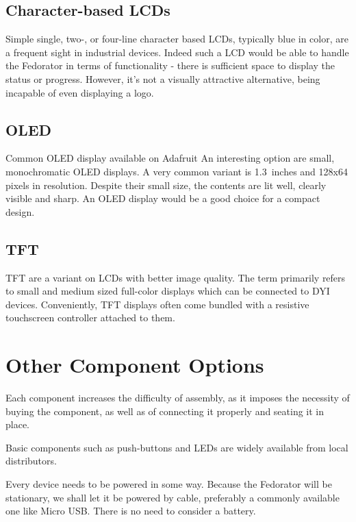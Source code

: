         \subsection{Character-based LCDs}
            Simple single, two-, or four-line character based LCDs, typically blue in color, are a frequent sight in industrial devices.  Indeed such a LCD would be able to handle the Fedorator in terms of functionality - there is sufficient space to display the status or progress.  However, it's not a visually attractive alternative, being incapable of even displaying a logo.
            
            
        \subsection{OLED}
                {Common OLED display available on Adafruit \cite{adafruit-oled}}
            An interesting option are small, monochromatic OLED displays.  A very common variant is 1.3~inches and 128x64 pixels in resolution\cite{adafruit-oled}.  Despite their small size, the contents are lit well, clearly visible and sharp.  An OLED display would be a good choice for a compact design. 
            
        \subsection{TFT}
            TFT are a variant on LCDs with better image quality\cite{lifewire-what-is-tft-lcd}.  The term primarily refers to small and medium sized full-color displays which can be connected to DYI devices.  Conveniently, TFT displays often come bundled with a resistive touchscreen controller attached to them.
            
    \section{Other Component Options}
        Each component increases the difficulty of assembly, as it imposes the necessity of buying the component, as well as of connecting it properly and seating it in place.
        
        Basic components such as push-buttons and LEDs are widely available from local distributors.
        
        Every device needs to be powered in some way.  Because the Fedorator will be stationary, we shall let it be powered by cable, preferably a commonly available one like Micro USB.  There is no need to consider a battery.
